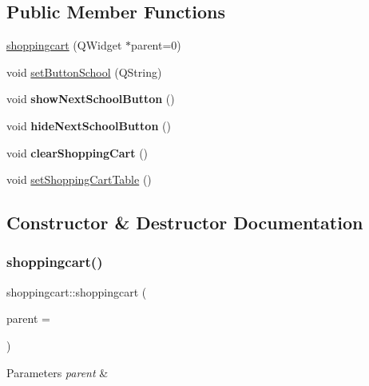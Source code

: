 \subsection*{Public Member Functions}
\begin{DoxyCompactItemize}
\item 
\hyperlink{classshoppingcart_ab9afe2335432f5e6fb4151cdd0107a39}{shoppingcart} (Q\+Widget $\ast$parent=0)
\item 
void \hyperlink{classshoppingcart_a7e363411f4c1fc00f4c5df86e979e561}{set\+Button\+School} (Q\+String)
\item 
\mbox{\label{classshoppingcart_acccaf3095f65f6f9bc6e8ac38abd19dc}} 
void {\bfseries show\+Next\+School\+Button} ()
\item 
\mbox{\label{classshoppingcart_aafe0055ed5123a9193f6a3bbc04af38a}} 
void {\bfseries hide\+Next\+School\+Button} ()
\item 
\mbox{\label{classshoppingcart_a8f4c18672debf9d273878965303ea328}} 
void {\bfseries clear\+Shopping\+Cart} ()
\item 
void \hyperlink{classshoppingcart_a4fd7f6a6c50e2f200daf3963d07e614d}{set\+Shopping\+Cart\+Table} ()
\end{DoxyCompactItemize}


\subsection{Constructor \& Destructor Documentation}
\mbox{\label{classshoppingcart_ab9afe2335432f5e6fb4151cdd0107a39}} 
\subsubsection{\texorpdfstring{shoppingcart()}{shoppingcart()}}
{\footnotesize\ttfamily shoppingcart\+::shoppingcart (\begin{DoxyParamCaption}\item[{Q\+Widget $\ast$}]{parent = {} }\end{DoxyParamCaption})\hspace{0.3cm}{\ttfamily [explicit]}}


\begin{DoxyParams}{Parameters}
{\em parent} & \\
\hline
\end{DoxyParams}


